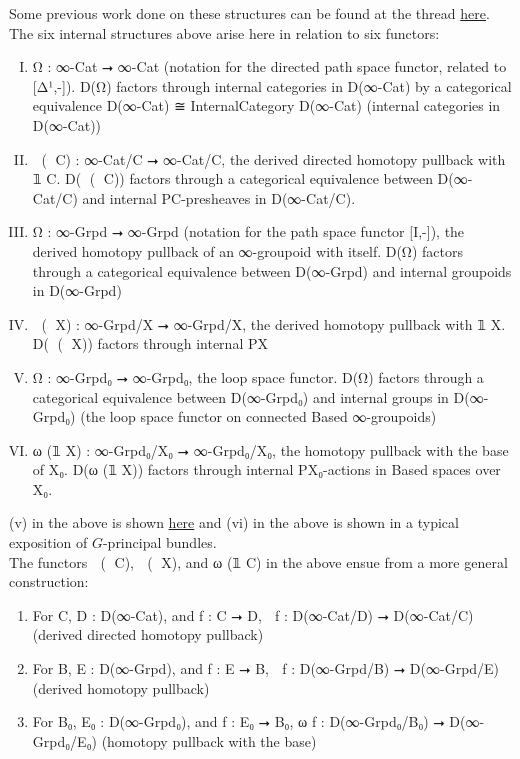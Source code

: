 \documentclass{book}
\theoremstyle{definition}
\begin{document}
Some previous work done on these structures can be found at the thread \href{https://leanprover.zulipchat.com/#narrow/stream/116395-maths/topic/Internal.20categories}{here}.\\

The six internal structures above arise here in relation to six functors:

\begin{enumerate}[(I)]
\item Ω⃗ : ∞-Cat ⭢ ∞-Cat (notation for the directed path space functor, related to [Δ¹,-]). D(Ω⃗) factors through internal categories in D(∞-Cat) by a categorical equivalence D(∞-Cat) ≅ InternalCategory D(∞-Cat) (internal categories in D(∞-Cat))
\item ω⃗ (𝟙 C) : ∞-Cat/C ⭢ ∞-Cat/C, the derived directed homotopy pullback with 𝟙 C. D(ω⃗ (𝟙 C)) factors through a categorical equivalence between D(∞-Cat/C) and internal P⃗C-presheaves in D(∞-Cat/C).
\item Ω⃡ : ∞-Grpd ⭢ ∞-Grpd (notation for the path space functor [I,-]), the derived homotopy pullback of an ∞-groupoid with itself. D(Ω⃡) factors through a categorical equivalence between D(∞-Grpd) and internal groupoids in D(∞-Grpd)
\item ω⃡ (𝟙 X) : ∞-Grpd/X ⭢ ∞-Grpd/X, the derived homotopy pullback with 𝟙 X. D(ω⃡ (𝟙 X)) factors through internal P⃡X
\item Ω : ∞-Grpd₀ ⭢ ∞-Grpd₀, the loop space functor. D(Ω) factors through a categorical equivalence between D(∞-Grpd₀) and internal groups in D(∞-Grpd₀) (the loop space functor on connected Based ∞-groupoids)
\item ω (𝟙 X) : ∞-Grpd₀/X₀ ⭢ ∞-Grpd₀/X₀, the homotopy pullback with the base of X₀. D(ω (𝟙 X)) factors through internal PX₀-actions in Based spaces over X₀.
\end{enumerate}

(v) in the above is shown \href{https://mathoverflow.net/questions/128883/why-omega-x-and-bg-are-adjoint-functors}{here} and (vi) in the above is shown in a typical exposition of $G$-principal bundles.\\

The functors ω⃗ (𝟙 C), ω⃡ (𝟙 X), and ω (𝟙 C) in the above ensue from a more general construction:\\

\begin{enumerate}
\item For C, D : D(∞-Cat), and f : C ⭢ D, ω⃗ f : D(∞-Cat/D) ⭢ D(∞-Cat/C)   (derived directed homotopy pullback)
\item For B, E : D(∞-Grpd), and f : E ⭢ B, ω⃡ f : D(∞-Grpd/B) ⭢ D(∞-Grpd/E) (derived homotopy pullback)
\item For B₀, E₀ : D(∞-Grpd₀), and f : E₀ ⭢ B₀, ω f : D(∞-Grpd₀/B₀) ⭢ D(∞-Grpd₀/E₀) (homotopy pullback with the base)
\end{enumerate}
\end{document}
